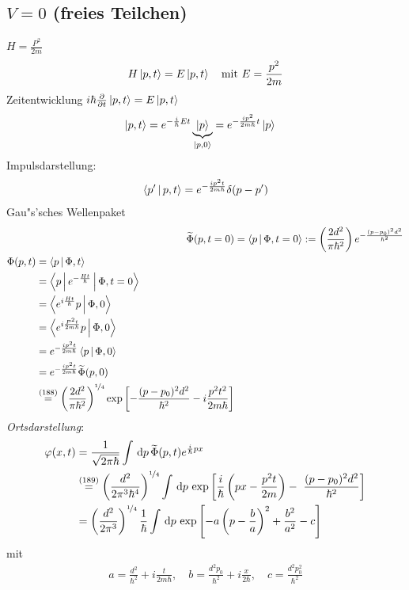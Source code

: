 \documentclass[a4paper]{scrartcl}
\newcommand{\dd}{\ensuremath \, \mathrm{d}}
\renewcommand{\phi}{\ensuremath \varphi}
\begin{document}
{\subsection{$V = 0$ (freies Teilchen)}
$H = \frac {P^2}{2m}$
\begin{align}
H \Ket {p, t} = E \Ket{ p, t} \quad  \mathrm{ mit \ } E = \frac{p^2}{2m}
\end{align}
Zeitentwicklung $i \hbar \frac \partial {\partial t} \Ket{ p, t} = E \Ket{ p, t}$
\begin{align}
\ket{ p,t} & = e^{- \frac i \hbar E t} \underbrace{ \Ket p }_{\Ket{ p, 0}} = e^{- \frac {i p^2}{2 m \hbar} t} \Ket p
\end{align}
Impulsdarstellung:
\begin{align}
\Braket{ p' | p, t} = e^{- \frac{i p^2 t}{2 m \hbar}} \delta (p - p')
\end{align}
Gau"s'sches Wellenpaket
\begin{align}
\widetilde \Phi (p, t=0) & = \Braket { p | \Phi, t=0} := \left( \frac{ 2d^2}{\pi \hbar^2 } \right) e^{- \frac{(p - p_0)^2 d^2} {\hbar^2}} \\
\begin{split}
\Phi(p, t) & = \Braket{ p | \Phi, t} \\
& = \Braket{ p | e^{- \frac{Ht}{\hbar}} | \Phi, t=0} \\
& = \Braket{ e^{i \frac {H t}{\hbar}} p| \Phi, 0} \\
& = \Braket{ e^{i \frac{P^2 t}{2m \hbar}} p | \Phi, 0} \\
& = e^{- \frac {i p^2 t}{2m \hbar}} \Braket{ p | \Phi, 0} \\
& = e^{- \frac{i p^2 t}{2m \hbar}} \widetilde \Phi(p, 0) \\
& \stackrel{(188)}= \left( \frac{2d^2}{\pi \hbar^2} \right) ^{\nicefrac 1 4} \exp \left[- \frac{ (p-p_0)^2 d^2}{\hbar^2} - i \frac{p^2 t^2}{2m \hbar}\right]
\end{split}
\end{align}
\emph{Ortsdarstellung}:
\begin{align}
\begin{split}
\phi(x,t) & = \frac 1{\sqrt{2 \pi \hbar}} \int \dd p \, \widetilde \Phi(p,t) e^{\frac i \hbar p x} \\
& \stackrel{(189)}= \left( \frac {d^2}{2 \pi^3 \hbar^4} \right)^{\nicefrac 1 4} \int \dd p \, \exp \left[ \frac i \hbar \left(p x - \frac{ p^2 t}{2m} \right) - \ \frac{ (p - p_0)^2 d^2}{\hbar^2} \right] \\
& = \left( \frac{d^2}{2 \pi^3} \right)^{\nicefrac 1 4} \frac 1 \hbar \int \dd p \, \exp \left[ - a \left( p - \frac b a \right)^2 + \frac{b^2}{a^2} - c \right]
\end{split}
\end{align}
mit 
\begin{align}
a = \frac{d^2}{\hbar^2} + i \frac t {2m \hbar}, \quad b = \frac{d^2 p_0}{\hbar^2} + i \frac{x}{2 \hbar}, \quad c = \frac{d^2 p_0^2}{\hbar^2}
\end{align}

}
\end{document}
